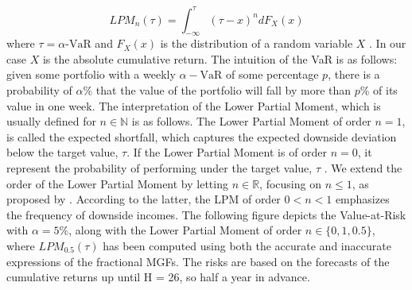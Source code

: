 \begin{equation}
    LPM_n(\tau) = \int_{-\infty}^{\tau} ( \tau - x)^n dF_X(x)
\end{equation}
 where \(\tau = \alpha\text{-VaR}\) and \(F_X(x)\) is the distribution of a random variable \(X\) \cite{wojt2009}. In our case \(X\) is the absolute cumulative return.  The intuition of the VaR is as follows: given some portfolio with a weekly \(\alpha-\text{VaR}\) of some percentage \(p\), there is a
probability of \(\alpha\)\% that the value of the portfolio will fall by more than \(p\)\% of its value in one week. The interpretation of the Lower Partial Moment, which is usually defined for \(n \in \mathbb{N}\) is as follows. The Lower Partial Moment of order \( n = 1\), is called the expected shortfall, which captures the expected downside deviation below the target value, \(\tau\). If the Lower Partial Moment is of order \( n = 0\), it represent the probability of performing under the target value, \(\tau\) \cite{sortino2001}. We extend the order of the Lower Partial Moment by letting \(n \in \mathbb{R}\), focusing on \( n \leq 1\), as proposed by \cite{fishburn1977}. According to the latter, the LPM of order \( 0 < n < 1\) emphasizes the frequency of downside incomes. The following figure depicts the Value-at-Risk with \(\alpha = 5\)\%, along with the Lower Partial Moment of order \(n \in \{0, 1, 0.5\}\), where \(LPM_{0.5}(\tau)\) has been computed using both the accurate and inaccurate expressions of the fractional MGFs. The risks are based on the forecasts of the cumulative returns up until H = 26, so half a year in advance.


